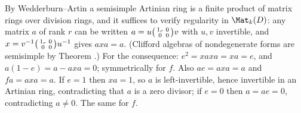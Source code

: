 By Wedderburn--Artin a semisimple Artinian ring is a finite product of matrix rings over division rings, and it suffices to verify regularity in $\Mat_k(D)$: any matrix $a$ of rank $r$ can be written $a = u \begin{psmallmatrix} 1_r & 0 \\ 0 & 0\end{psmallmatrix} v$ with $u, v$ invertible, and $x = v^{-1} \begin{psmallmatrix} 1_r & 0 \\ 0 & 0 \end{psmallmatrix} u^{-1}$ gives $axa = a$. (Clifford algebras of nondegenerate forms are semisimple by Theorem .) For the consequence: $e^2 = xaxa = xa = e$, and $a(1-e) = a - axa = 0$; symmetrically for $f$. Also $ae = axa = a$ and $fa = axa = a$. If $e = 1$ then $xa = 1$, so $a$ is left-invertible, hence invertible in an Artinian ring, contradicting that $a$ is a zero divisor; if $e = 0$ then $a = ae = 0$, contradicting $a \neq 0$. The same for $f$.
